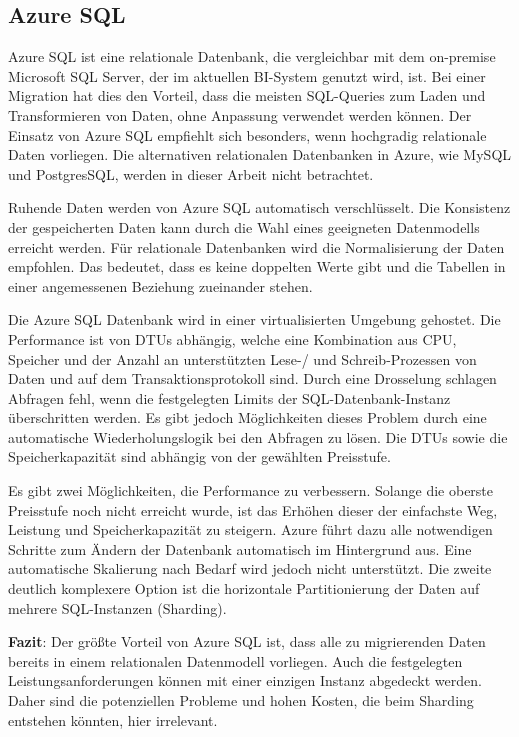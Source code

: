\subsection{Azure SQL} \label{sec:grundlagen:azure_dienste:sql}
Azure SQL ist eine relationale Datenbank, die vergleichbar mit dem on-premise Microsoft SQL Server, der im aktuellen BI-System genutzt wird, ist. Bei einer Migration hat dies den Vorteil, dass die meisten SQL-Queries zum Laden und Transformieren von Daten, ohne Anpassung verwendet werden können. Der Einsatz von Azure SQL empfiehlt sich besonders, wenn hochgradig relationale Daten vorliegen. Die alternativen relationalen Datenbanken in Azure, wie MySQL und PostgresSQL, werden in dieser Arbeit nicht betrachtet.

Ruhende Daten werden von Azure SQL automatisch verschlüsselt. Die Konsistenz der gespeicherten Daten kann durch die Wahl eines geeigneten Datenmodells erreicht werden. Für relationale Datenbanken wird die Normalisierung der Daten empfohlen. Das bedeutet, dass es keine doppelten Werte gibt und die Tabellen in einer angemessenen Beziehung zueinander stehen.

Die Azure SQL Datenbank wird in einer virtualisierten Umgebung gehostet. Die Performance ist von DTUs abhängig, welche eine Kombination aus CPU, Speicher und der Anzahl an unterstützten Lese-/ und Schreib-Prozessen von Daten und auf dem Transaktionsprotokoll sind. Durch eine Drosselung schlagen Abfragen fehl, wenn die festgelegten Limits der SQL-Datenbank-Instanz überschritten werden. Es gibt jedoch Möglichkeiten dieses Problem durch eine automatische Wiederholungslogik bei den Abfragen zu lösen. Die DTUs sowie die Speicherkapazität sind abhängig von der gewählten Preisstufe.


Es gibt zwei Möglichkeiten, die Performance zu verbessern. Solange die oberste Preisstufe noch nicht erreicht wurde, ist das Erhöhen dieser der einfachste Weg, Leistung und Speicherkapazität zu steigern. Azure führt dazu alle notwendigen Schritte zum Ändern der Datenbank automatisch im Hintergrund aus. Eine automatische Skalierung nach Bedarf wird jedoch nicht unterstützt. Die zweite deutlich komplexere Option ist die horizontale Partitionierung der Daten auf mehrere SQL-Instanzen (Sharding). \cite{reagan_web_2018}

\textbf{Fazit}: Der größte Vorteil von Azure SQL ist, dass alle zu migrierenden Daten bereits in einem relationalen Datenmodell vorliegen. Auch die festgelegten Leistungsanforderungen können mit einer einzigen Instanz abgedeckt werden. Daher sind die potenziellen Probleme und hohen Kosten, die beim Sharding entstehen könnten, hier irrelevant.

